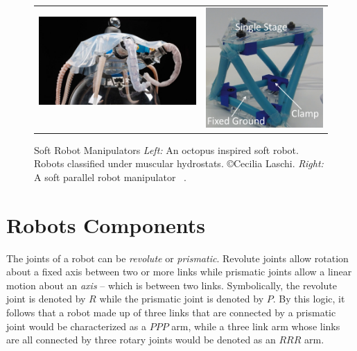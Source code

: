\begin{figure}[tb!]
	\centering
	\begin{tabular}{@{}c@{}c@{}}
		\includegraphics[width=0.50\linewidth ,height=0.4\columnwidth]{figures/octopus.jpg} \,\,
		&
		\includegraphics[width=0.48\columnwidth,height=0.4\columnwidth]{figures/soft_parallel.png}
	\end{tabular}
	\caption{Soft Robot Manipulators \textit{Left:} An octopus inspired soft robot. Robots classified under muscular hydrostats. \copyright Cecilia Laschi. \textit{Right:} A soft parallel robot manipulator ~\cite{hopkins2015synthesis}.}
	\label{fig:soft_robots}
\end{figure}

 \section{Robots Components}
 
The joints of a robot can be \textit{revolute} or \textit{prismatic}. Revolute joints allow rotation about a fixed axis between two or more links while prismatic joints allow a linear motion about an \textit{axis} -- which is between two links. Symbolically, the revolute joint is denoted by $R$ while the prismatic joint is denoted by $P$. By this logic, it follows that a robot made up of three links that are connected by a prismatic joint would be characterized as a $PPP$ arm, while a three link arm whose links are all connected by three rotary joints would be denoted as an $RRR$ arm. 
 
